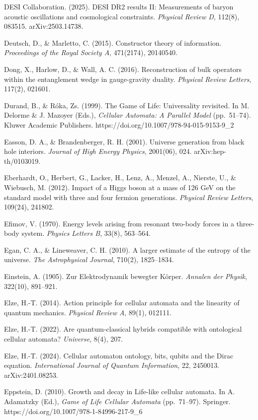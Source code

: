 \documentclass[
]{article}
\begin{document}
DESI Collaboration. (2025). DESI DR2 results II: Measurements of baryon
acoustic oscillations and cosmological constraints. \emph{Physical
Review D}, 112(8), 083515. arXiv:2503.14738.

Deutsch, D., \& Marletto, C. (2015). Constructor theory of information.
\emph{Proceedings of the Royal Society A}, 471(2174), 20140540.

Dong, X., Harlow, D., \& Wall, A. C. (2016). Reconstruction of bulk
operators within the entanglement wedge in gauge-gravity duality.
\emph{Physical Review Letters}, 117(2), 021601.

Durand, B., \& Róka, Zs. (1999). The Game of Life: Universality
revisited. In M. Delorme \& J. Mazoyer (Eds.), \emph{Cellular Automata:
A Parallel Model} (pp.~51--74). Kluwer Academic Publishers.
https://doi.org/10.1007/978-94-015-9153-9\_2

Easson, D. A., \& Brandenberger, R. H. (2001). Universe generation from
black hole interiors. \emph{Journal of High Energy Physics}, 2001(06),
024. arXiv:hep-th/0103019.

Eberhardt, O., Herbert, G., Lacker, H., Lenz, A., Menzel, A., Nierste,
U., \& Wiebusch, M. (2012). Impact of a Higgs boson at a mass of 126 GeV
on the standard model with three and four fermion generations.
\emph{Physical Review Letters}, 109(24), 241802.

Efimov, V. (1970). Energy levels arising from resonant two-body forces
in a three-body system. \emph{Physics Letters B}, 33(8), 563--564.

Egan, C. A., \& Lineweaver, C. H. (2010). A larger estimate of the
entropy of the universe. \emph{The Astrophysical Journal}, 710(2),
1825--1834.

Einstein, A. (1905). Zur Elektrodynamik bewegter Körper. \emph{Annalen
der Physik}, 322(10), 891--921.

Elze, H.-T. (2014). Action principle for cellular automata and the
linearity of quantum mechanics. \emph{Physical Review A}, 89(1), 012111.

Elze, H.-T. (2022). Are quantum-classical hybrids compatible with
ontological cellular automata? \emph{Universe}, 8(4), 207.

Elze, H.-T. (2024). Cellular automaton ontology, bits, qubits and the
Dirac equation. \emph{International Journal of Quantum Information}, 22,
2450013. arXiv:2401.08253.

Eppstein, D. (2010). Growth and decay in Life-like cellular automata. In
A. Adamatzky (Ed.), \emph{Game of Life Cellular Automata} (pp.~71--97).
Springer. https://doi.org/10.1007/978-1-84996-217-9\_6
\end{document}
